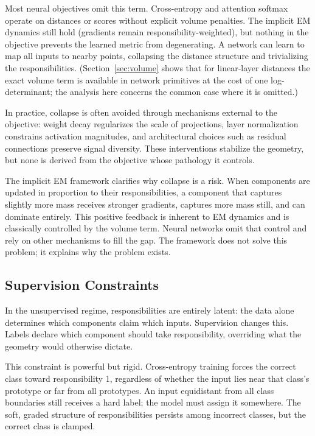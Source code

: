 Most neural objectives omit this term. Cross-entropy and attention softmax operate on distances or scores without explicit volume penalties. The implicit EM dynamics still hold (gradients remain responsibility-weighted), but nothing in the objective prevents the learned metric from degenerating. A network can learn to map all inputs to nearby points, collapsing the distance structure and trivializing the responsibilities. (Section~\ref{sec:volume} shows that for linear-layer distances the exact volume term is available in network primitives at the cost of one log-determinant; the analysis here concerns the common case where it is omitted.)

In practice, collapse is often avoided through mechanisms external to the objective: weight decay regularizes the scale of projections, layer normalization constrains activation magnitudes, and architectural choices such as residual connections preserve signal diversity. These interventions stabilize the geometry, but none is derived from the objective whose pathology it controls.

The implicit EM framework clarifies why collapse is a risk. When components are updated in proportion to their responsibilities, a component that captures slightly more mass receives stronger gradients, captures more mass still, and can dominate entirely. This positive feedback is inherent to EM dynamics and is classically controlled by the volume term. Neural networks omit that control and rely on other mechanisms to fill the gap. The framework does not solve this problem; it explains why the problem exists.

\subsection{Supervision Constraints}

In the unsupervised regime, responsibilities are entirely latent: the data alone determines which components claim which inputs. Supervision changes this. Labels declare which component should take responsibility, overriding what the geometry would otherwise dictate.

This constraint is powerful but rigid. Cross-entropy training forces the correct class toward responsibility 1, regardless of whether the input lies near that class's prototype or far from all prototypes. An input equidistant from all class boundaries still receives a hard label; the model must assign it somewhere. The soft, graded structure of responsibilities persists among incorrect classes, but the correct class is clamped.


